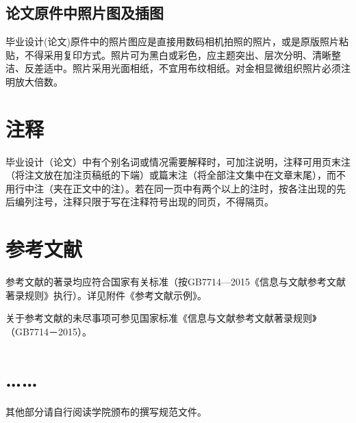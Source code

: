\subsection{论文原件中照片图及插图}
毕业设计(论文)原件中的照片图应是直接用数码相机拍照的照片，或是原版照片粘贴，不得采用复印方式。照片可为黑白或彩色，应主题突出、层次分明、清晰整洁、反差适中。照片采用光面相纸，不宜用布纹相纸。对金相显微组织照片必须注明放大倍数。

\section{注释}
毕业设计（论文）中有个别名词或情况需要解释时，可加注说明，注释可用页末注（将注文放在加注页稿纸的下端）或篇末注（将全部注文集中在文章末尾），而不用行中注（夹在正文中的注）。若在同一页中有两个以上的注时，按各注出现的先后编列注号，注释只限于写在注释符号出现的同页，不得隔页。

\section{参考文献}
参考文献的著录均应符合国家有关标准（按GB7714—2015《信息与文献参考文献著录规则》执行）。详见附件《参考文献示例》。

关于参考文献的未尽事项可参见国家标准《信息与文献参考文献著录规则》（GB7714－2015）。

\section{……}
其他部分请自行阅读学院颁布的撰写规范文件。
